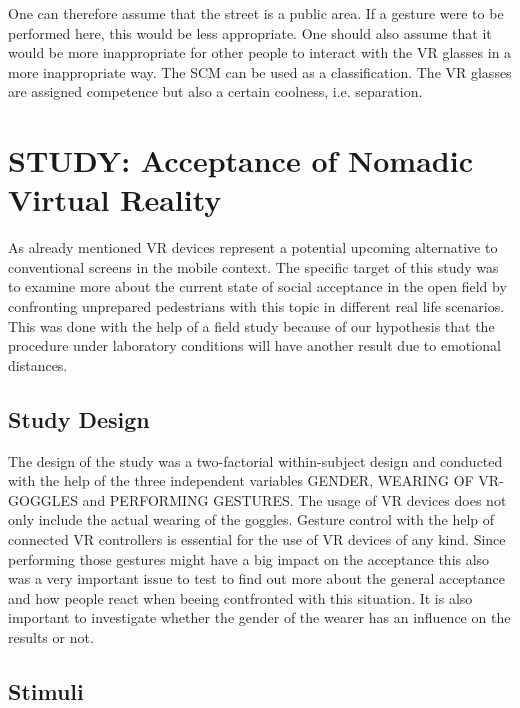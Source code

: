 \documentclass[sigchi]{acmart}
\begin{document}
One can therefore assume that the street is a public area. If a gesture were to be performed here, this would be less appropriate. One should also assume that it would be more inappropriate for other people to interact with the VR glasses in a more inappropriate way. The SCM can be used as a classification. The VR glasses are assigned competence but also a certain coolness, i.e. separation.


\section{STUDY: Acceptance of Nomadic Virtual Reality}

As already mentioned VR devices represent a potential upcoming alternative to conventional screens in the mobile context. The specific target of this study was to examine more about the current state of social acceptance in the open field by confronting unprepared pedestrians with this topic in different real life scenarios. This was done with the help of a field study because of our hypothesis that the procedure under laboratory conditions will have another result due to emotional distances.

\subsection{Study Design}

The design of the study was a two-factorial within-subject design and conducted with the help of the three independent variables GENDER, WEARING OF VR-GOGGLES and PERFORMING GESTURES. The usage of VR devices does not only include the actual wearing of the goggles. Gesture control with the help of connected VR controllers is essential for the use of VR devices of any kind. Since performing those gestures might have a big impact on the acceptance this also was a very important issue to test to find out more about the general acceptance and how people react when beeing contfronted with this situation. It is also important to investigate whether the gender of the wearer has an influence on the results or not.

\subsection{Stimuli}
\end{document}

